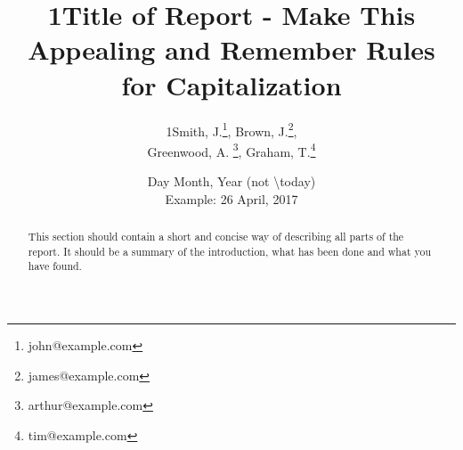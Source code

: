 \documentclass[11pt]{article}
\title{
    1Title of Report - Make This Appealing and Remember Rules for Capitalization
    }
\author{
	1Smith, J.\footnote{john@example.com}, Brown, J.\footnote{james@example.com}, \\
    Greenwood, A. \footnote{arthur@example.com}, Graham, T.\footnote{tim@example.com}
}
\date{
    Day Month, Year (not \textbackslash today)\\
    Example: 26 April, 2017
}
\begin{document}
\maketitle
\begin{abstract}
    This section should contain a short and concise way of describing all parts of the report. It should be a summary of the introduction, what has been done and what you have found.
\end{abstract}
\newpage
\tableofcontents
\newpage
{} %






\newpage


\appendix
{}



\end{document}
